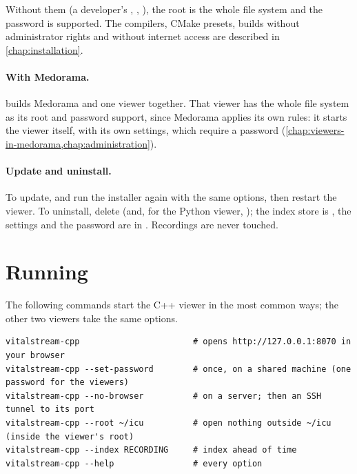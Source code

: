Without them (a developer's , ,
), the root is the whole file system and the password is supported. The
compilers, CMake presets, builds without administrator rights and without internet access are
described in \cref{chap:installation}.

\paragraph{With Medorama.}  builds Medorama and one viewer
together. That viewer has the whole file system as its root and password support, since Medorama
applies its own rules: it starts the viewer itself, with its own settings, which require a
password (\cref{chap:viewers-in-medorama,chap:administration}).

\paragraph{Update and uninstall.} To update,  and run the installer again with the
same options, then restart the viewer. To uninstall, delete 
(and, for the Python viewer, ); the index store is
, the settings and the password are in
. Recordings are never touched.

\section{Running}
\label{sec:vitalstream-run}

The following commands start the C++ viewer in the most common ways; the other two viewers take
the same options.
\begin{lstlisting}[style=shell]
vitalstream-cpp                       # opens http://127.0.0.1:8070 in your browser
vitalstream-cpp --set-password        # once, on a shared machine (one password for the viewers)
vitalstream-cpp --no-browser          # on a server; then an SSH tunnel to its port
vitalstream-cpp --root ~/icu          # open nothing outside ~/icu (inside the viewer's root)
vitalstream-cpp --index RECORDING     # index ahead of time
vitalstream-cpp --help                # every option
\end{lstlisting}

